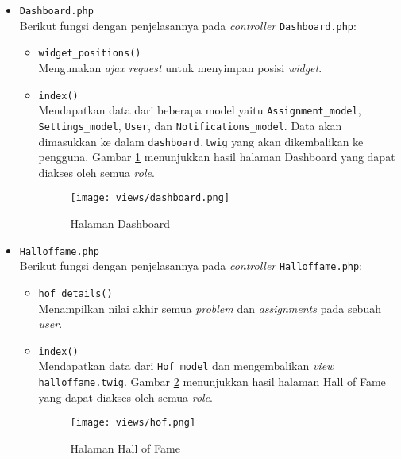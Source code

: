\begin{itemize}
	\item \verb|Dashboard.php| \\
	      Berikut fungsi dengan penjelasannya pada \textit{controller} \verb|Dashboard.php|:

	      \begin{itemize}
		      \item \verb|widget_positions()| \\
		            Mengunakan \textit{ajax request} untuk menyimpan posisi \textit{widget}.

		      \item \verb|index()| \\
		            Mendapatkan data dari beberapa model yaitu \verb|Assignment_model|, \verb|Settings_model|, \verb|User|, dan \verb|Notifications_model|. Data akan dimasukkan ke dalam \verb|dashboard.twig| yang akan dikembalikan ke pengguna. Gambar \ref{fig:3:1:1:dashboard} menunjukkan hasil halaman Dashboard yang dapat diakses oleh semua \textit{role}.

		            \begin{figure}[H]
			            \centering
			            \texttt{[image: views/dashboard.png]}
			            \caption{Halaman Dashboard}
			            \label{fig:3:1:1:dashboard}
		            \end{figure}

	      \end{itemize}

	\item \verb|Halloffame.php| \\
	      Berikut fungsi dengan penjelasannya pada \textit{controller} \verb|Halloffame.php|:

	      \begin{itemize}
		      \item \verb|hof_details()| \\
		            Menampilkan nilai akhir semua \textit{problem} dan \textit{assignments} pada sebuah \textit{user}.
		      \item \verb|index()| \\
		            Mendapatkan data dari \verb|Hof_model| dan mengembalikan \textit{view} \verb|halloffame.twig|. Gambar \ref{fig:3:1:1:hof} menunjukkan hasil halaman Hall of Fame yang dapat diakses oleh semua \textit{role}.

		            \begin{figure}[H]
			            \centering
			            \texttt{[image: views/hof.png]}
			            \caption{Halaman Hall of Fame}
			            \label{fig:3:1:1:hof}
		            \end{figure}


\end{itemize}
\end{itemize}
